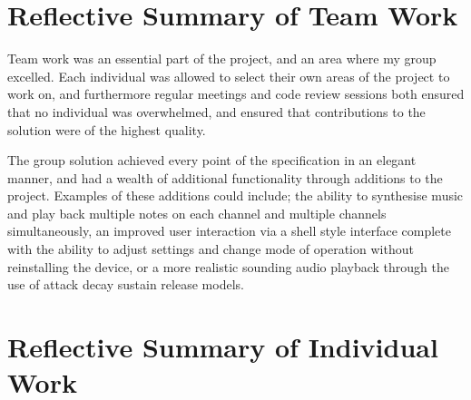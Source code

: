 \section{Reflective Summary of Team Work}

Team work was an essential part of the project, and an area where my group 
excelled. Each individual was allowed to select their own areas of the project 
to work on, and furthermore regular meetings and code review sessions both ensured 
that no individual was overwhelmed, and ensured that contributions to the 
solution were of the highest quality. 
\par\bigskip\noindent
The group solution achieved every point of the specification in an elegant 
manner, and had a wealth of additional functionality through additions to the 
project. 
Examples of these additions could include; the ability to synthesise music and 
play back multiple notes on each channel and multiple channels simultaneously, 
an improved user interaction via a shell style interface complete with the 
ability to adjust settings and change mode of operation without reinstalling the 
device, or a more realistic sounding audio playback through the use of attack
decay sustain release models. 

\section{Reflective Summary of Individual Work}

